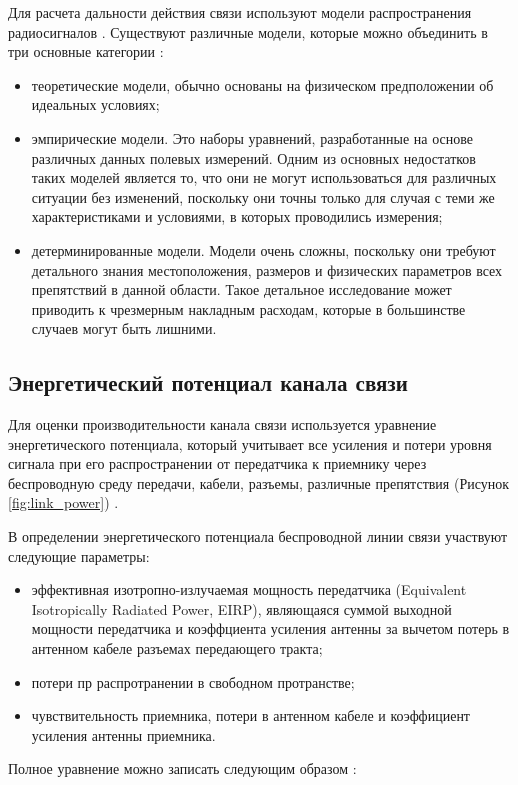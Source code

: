 Для расчета дальности действия связи используют модели распространения радиосигналов \cite{ElChall2019, Zhang2021, Caso2015, Kang2020}. Существуют различные модели, которые можно объединить в три основные категории \cite{Oni2017}:
  \begin{itemize}
    \item теоретические модели, обычно основаны на физическом предположении об идеальных условиях;
    \item эмпирические модели. Это наборы уравнений, разработанные на основе различных данных полевых измерений. Одним из основных недостатков таких моделей является то, что они не могут использоваться для различных ситуации без изменений, поскольку они точны только для случая с теми же характеристиками и условиями, в которых проводились измерения;
    \item детерминированные модели. Модели очень сложны, поскольку они требуют детального знания местоположения, размеров и физических параметров всех препятствий в данной области. Такое детальное исследование может приводить к чрезмерным накладным расходам, которые в большинстве случаев могут быть лишними.
  \end{itemize}

\subsection{Энергетический потенциал канала связи}
Для оценки производительности канала связи используется уравнение энергетического потенциала, который учитывает все усиления и потери уровня сигнала при его распространении от передатчика к приемнику через беспроводную  среду передачи, кабели, разъемы, различные препятствия (Рисунок \cref{fig:link_power}) \cite{Proletarsky}.

В определении энергетического потенциала беспроводной линии связи участвуют следующие параметры:
\begin{itemize}
  \item эффективная изотропно-излучаемая мощность передатчика (Equivalent Isotropically Radiated Power, EIRP), являющаяся суммой выходной мощности передатчика и коэффциента усиления антенны за вычетом потерь в антенном кабеле разъемах передающего тракта;
  \item потери пр распротранении в свободном протранстве;
  \item чувствительность приемника, потери в антенном кабеле и коэффициент усиления антенны приемника.
\end{itemize}
Полное уравнение можно записать следующим образом \cite{Proletarsky}:


